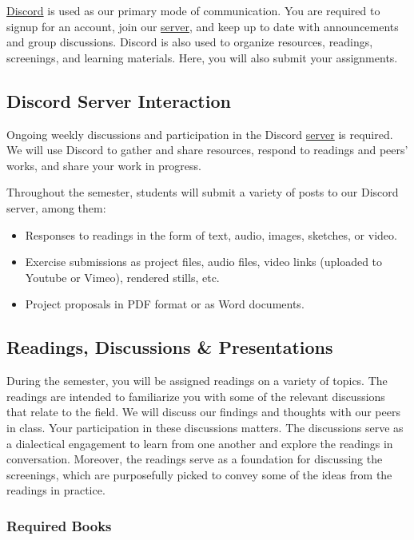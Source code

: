 \href{http://discordapp.com/}{Discord} is used as our primary mode of communication. You are required to signup for an account, join our \href{\discordURL}{server}, and keep up to date with announcements and group discussions. Discord is also used to organize resources, readings, screenings, and learning materials. Here, you will also submit your assignments.

\subsection{Discord Server Interaction}
Ongoing weekly discussions and participation in the Discord \href{\discordURL}{server} is required. We will use Discord to gather and share resources, respond to readings and peers' works, and share your work in progress.

Throughout the semester, students will submit a variety of posts to our Discord server, among them:

\begin{itemize}
      \tightlist
      \item Responses to readings in the form of text, audio, images, sketches, or video.
      \item Exercise submissions as project files, audio files, video links (uploaded to Youtube or Vimeo), rendered stills, etc.
      \item Project proposals in PDF format or as Word documents.
\end{itemize}

\subsection{Readings, Discussions \& Presentations}

During the semester, you will be assigned readings on a variety of topics. The readings are intended to familiarize you with some of the relevant discussions that relate to the field. We will discuss our findings and thoughts with our peers in class. Your participation in these discussions matters. The discussions serve as a dialectical engagement to learn from one another and explore the readings in conversation. Moreover, the readings serve as a foundation for discussing the screenings, which are purposefully picked to convey some of the ideas from the readings in practice.

\subsubsection{Required Books}

